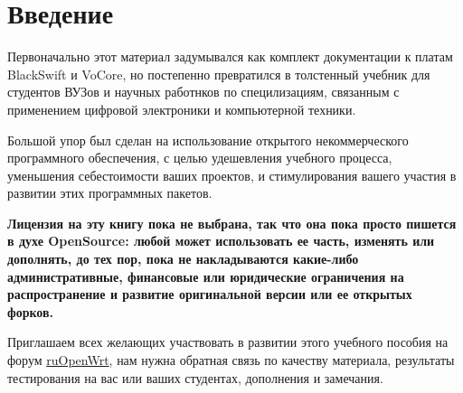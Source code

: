 \section*{Введение}

Первоначально этот материал задумывался как комплект документации к платам
BlackSwift и VoCore, но постепенно превратился в толстенный учебник для
студентов ВУЗов и научных работнков по специлизациям, связанным с применением
цифровой электроники и компьютерной техники.

Большой упор был сделан на использование открытого некоммерческого программного
обеспечения, с целью удешевления учебного процесса, уменьшения себестоимости
ваших проектов, и стимулирования вашего участия в развитии этих программных пакетов.

\bigskip
\textbf{Лицензия на эту книгу пока не выбрана, так что она пока просто пишется в
духе OpenSource: любой может использовать ее часть, изменять или дополнять, до
тех пор, пока не накладываются какие-либо административные, финансовые или
юридические ограничения на распространение и развитие оригинальной версии или ее
открытых форков.}
\bigskip

Приглашаем всех желающих участвовать в развитии этого учебного пособия на форум
\href{https://groups.google.com/forum/\#!forum/openwrt2ru}{ruOpenWrt}, нам нужна
обратная связь по качеству материала, результаты тестирования на вас или ваших
студентах, дополнения и замечания.
